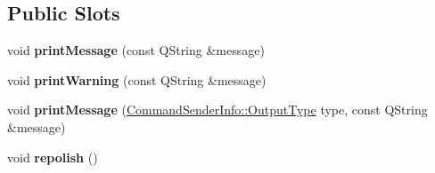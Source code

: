 \subsection*{Public Slots}
\begin{DoxyCompactItemize}
\item 
\hypertarget{class_console_widget_a04e2902e857852f3185c74de71ae3c9b}{void {\bfseries print\-Message} (const Q\-String \&message)}\label{class_console_widget_a04e2902e857852f3185c74de71ae3c9b}

\item 
\hypertarget{class_console_widget_adef216de346ef5f08f38c0874777167b}{void {\bfseries print\-Warning} (const Q\-String \&message)}\label{class_console_widget_adef216de346ef5f08f38c0874777167b}

\item 
\hypertarget{class_console_widget_a9f7957ef32ab4e68a58b0cbcf1c07c89}{void {\bfseries print\-Message} (\hyperlink{class_command_sender_info_a3a5e6a2ef1772f6557f351652c2e3b60}{Command\-Sender\-Info\-::\-Output\-Type} type, const Q\-String \&message)}\label{class_console_widget_a9f7957ef32ab4e68a58b0cbcf1c07c89}

\item 
\hypertarget{class_console_widget_ab079b67c769e850d451ad3fdbbbdc750}{void {\bfseries repolish} ()}\label{class_console_widget_ab079b67c769e850d451ad3fdbbbdc750}

\end{DoxyCompactItemize}
